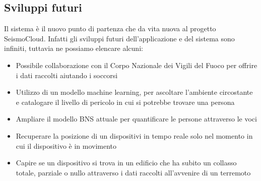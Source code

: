 \documentclass[main.tex]{subfiles}
\begin{document}
\subsection{Sviluppi futuri}
Il sistema  è il nuovo punto di partenza che da vita nuova al progetto SeismoCloud. Infatti gli sviluppi futuri dell'applicazione e del sistema sono infiniti, tuttavia ne possiamo elencare alcuni:
\begin{itemize}
    \item Possibile collaborazione con il Corpo Nazionale dei Vigili del Fuoco per offrire i dati raccolti aiutando i soccorsi
    \item Utilizzo di un modello machine learning, per ascoltare l'ambiente circostante e catalogare il livello di pericolo in cui si potrebbe trovare una persona
    \item Ampliare il modello BNS attuale per quantificare le persone attraverso le voci
    \item Recuperare la posizione di un dispositivi in tempo reale solo nel momento in cui il dispositivo è in movimento
    \item Capire se un dispositivo si trova in un edificio che ha subito un collasso totale, parziale o nullo attraverso i dati raccolti all'avvenire di un terremoto
\end{itemize}
\end{document}
